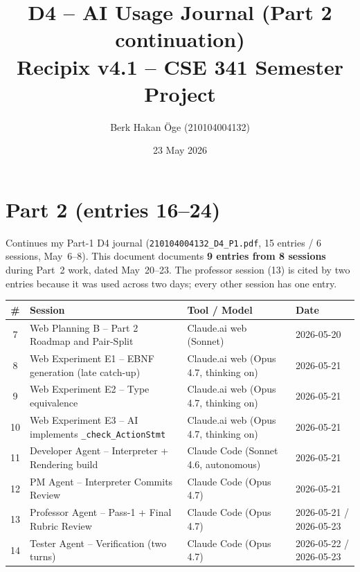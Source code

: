 \documentclass[11pt,a4paper]{article}
\title{\textbf{D4 -- AI Usage Journal (Part 2 continuation)} \\
       \large Recipix v4.1 -- CSE 341 Semester Project}
\author{Berk Hakan \"Oge (210104004132)}
\date{23 May 2026}
\begin{document}
\maketitle
\thispagestyle{fancy}


\section*{Part 2 (entries 16--24)}

Continues my Part-1 D4 journal (\texttt{210104004132\_D4\_P1.pdf},
15 entries / 6 sessions, May~6--8). This document documents
\textbf{9 entries from 8 sessions} during Part~2 work, dated
May~20--23. The professor session (13) is cited by two entries
because it was used across two days; every other session has one
entry.

\begin{center}
\small
\begin{tabular}{@{}clll@{}}
\toprule
\textbf{\#} & \textbf{Session} & \textbf{Tool / Model} & \textbf{Date} \\
\midrule
7  & Web Planning B -- Part 2 Roadmap and Pair-Split            & Claude.ai web (Sonnet)                        & 2026-05-20 \\
8  & Web Experiment E1 -- EBNF generation (late catch-up)       & Claude.ai web (Opus 4.7, thinking on)          & 2026-05-21 \\
9  & Web Experiment E2 -- Type equivalence                      & Claude.ai web (Opus 4.7, thinking on)          & 2026-05-21 \\
10 & Web Experiment E3 -- AI implements \texttt{\_check\_ActionStmt} & Claude.ai web (Opus 4.7, thinking on)      & 2026-05-21 \\
11 & Developer Agent -- Interpreter + Rendering build           & Claude Code (Sonnet 4.6, autonomous)          & 2026-05-21 \\
12 & PM Agent -- Interpreter Commits Review                     & Claude Code (Opus 4.7)                        & 2026-05-21 \\
13 & Professor Agent -- Pass-1 + Final Rubric Review            & Claude Code (Opus 4.7)                        & 2026-05-21 / 2026-05-23 \\
14 & Tester Agent -- Verification (two turns)                   & Claude Code (Opus 4.7)                        & 2026-05-22 / 2026-05-23 \\
\bottomrule
\end{tabular}
\end{center}
\end{document}
